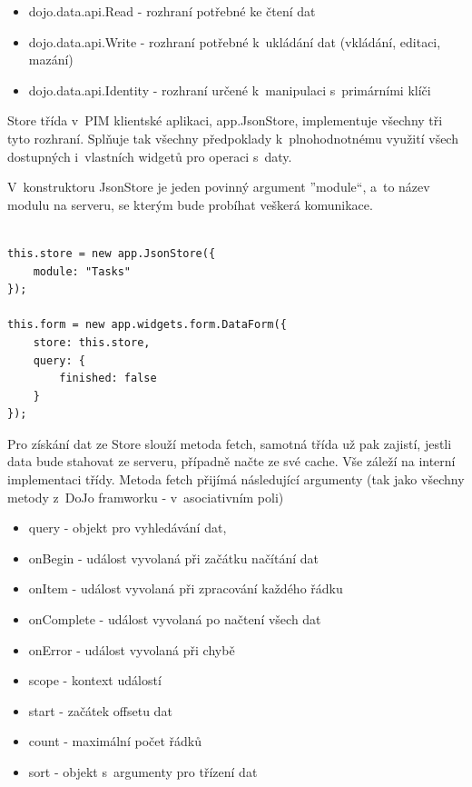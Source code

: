\documentclass[bc,male,html,dept460]{diploma}				%
\begin{document}
\begin{itemize}
  \item dojo.data.api.Read - rozhraní potřebné ke čtení dat
  \item dojo.data.api.Write - rozhraní potřebné k~ukládání dat (vkládání, editaci, mazání)
  \item dojo.data.api.Identity - rozhraní určené k~manipulaci s~primárními klíči
\end{itemize}

Store třída v~PIM klientské aplikaci, app.JsonStore, implementuje všechny tři tyto rozhraní. Splňuje tak všechny předpoklady k~plnohodnotnému využití všech dostupných i~vlastních widgetů pro operaci s~daty.

V~konstruktoru JsonStore je jeden povinný argument ''module``, a~to název modulu na serveru, se kterým bude probíhat veškerá komunikace.

\bigskip
\begin{lstlisting}[label=src:JavaScript,caption=Příklad užití JsonStore]

this.store = new app.JsonStore({
	module: "Tasks"
});

this.form = new app.widgets.form.DataForm({
	store: this.store,
	query: {
		finished: false
	}
});

\end{lstlisting}

Pro získání dat ze Store slouží metoda fetch, samotná třída už pak zajistí, jestli data bude stahovat ze serveru, případně načte ze své cache. Vše záleží na interní implementaci třídy.
Metoda fetch přijímá následující argumenty (tak jako všechny metody z~DoJo framworku - v~asociativním poli)

\begin{itemize}
  \item query - objekt pro vyhledávání dat,
  \item onBegin - událost vyvolaná při začátku načítání dat 
  \item onItem - událost vyvolaná při zpracování každého řádku
  \item onComplete - událost vyvolaná po načtení všech dat
  \item onError - událost vyvolaná při chybě
  \item scope - kontext událostí
  \item start - začátek offsetu dat
  \item count - maximální počet řádků
  \item sort - objekt s~argumenty pro třízení dat
\end{itemize}
\end{document}
